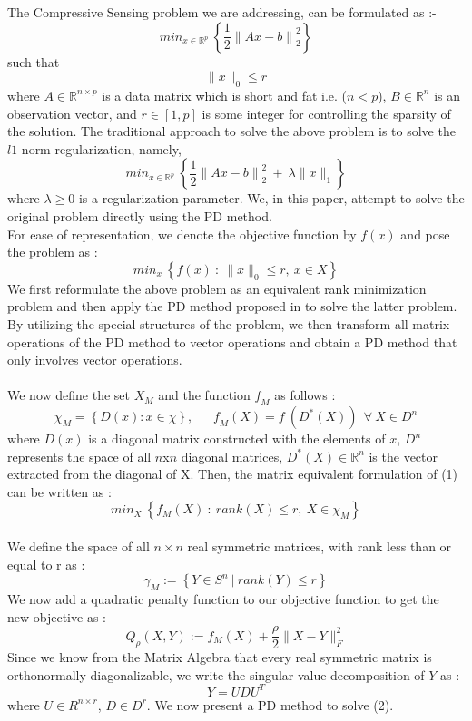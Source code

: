 \documentclass[letterpaper, 10 pt, conference]{article}
\begin{document}
The Compressive Sensing problem we are addressing, can be formulated as :-
$$min_{x\in{\mathbb{R}^{\textit{p}}}}\ \left\lbrace\frac{1}{2} {\|Ax-b \|}_{2}^{2}\right\rbrace$$
such that
$$\|x\|_0\leq r$$
where $A\in \mathbb{R}^{n \times p}$ is a data matrix which is short and fat i.e. ($n<p$), $B\in \mathbb{R}^n$ is an observation vector, and $r\in [1, p]$ is some integer for controlling the sparsity of the solution. The traditional approach to solve the above problem is to solve the $l1$-norm regularization, namely,
$$min_{x\in{\mathbb{R}^{\textit{p}}}}\ \left\lbrace\frac{1}{2} {\|Ax-b \|}_{2}^{2}\ +\ \lambda\|x\|_1\right\rbrace$$
where $\lambda\geq 0$ is a regularization parameter. We, in this paper, attempt to solve the original problem directly using the PD method.
\\
For ease of representation, we denote the objective function by $f(x)$ and pose the problem as :
\begin{equation}
min_{x}\ \left\lbrace{f(x)\ :\ \|x\|_0\leq r,\ x\in{\textit{X}}}\right\rbrace 
\end{equation}
We first reformulate the above problem as an equivalent rank minimization problem and then apply the PD method proposed in \cite{pd} to solve the latter problem. By utilizing the special structures of the problem, we then transform all matrix operations of the PD method to vector operations and obtain a PD method that only involves vector operations.
\\ \\
We now define the set $\textit{X}_M$ and the function $\textit{f}_M$ as follows :
$$\chi_M = \left\lbrace{{D(x):x\in{\chi}}}\right\rbrace,\ \ \ \ \ \ \ \textit{f}_M(X)=\textit{f}\ ({\textit{D}}^{\ast}(X))\ \ \forall\ X\in{D^n}$$ 
where $D(x)$ is a diagonal matrix constructed with the elements of $x$, $D^n$ represents the space of all $n$x$n$ diagonal matrices, $D^{\ast}(X)\in{\mathbb{R}^n}$ is the vector extracted from the diagonal of X. Then, the matrix equivalent formulation of (1) can be written as :
\begin{equation}
min_{X}\ \left\lbrace{f_M(X)\ :\ rank(X)\leq r,\ X\in{{\chi}_M}}\right\rbrace 
\end{equation}
\\
We define the space of all $n \times n$ real symmetric matrices, with rank less than or equal to r as :
$$\gamma_M := \left\lbrace{Y\in{S^n}\ |\ rank(Y)\leq{r}}\right\rbrace$$
We now add a quadratic penalty function to our objective function to get the new objective as :
$$Q_{\rho}(X,Y):=f_M(X)+\frac{\rho}{2}\|X-Y\|_{F}^{2}$$
Since we know from the Matrix Algebra that every real symmetric matrix is orthonormally diagonalizable, we write the singular value decomposition of $Y$ as :
$$Y=UDU^{T}$$
where $U\in{R^{n \times r}}$, $D\in{D^r}$. We now present a PD method to solve (2).
\newpage
\end{document}
